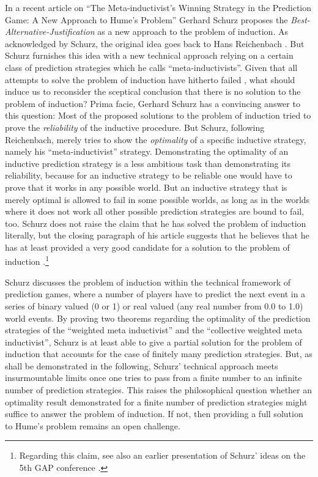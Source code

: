 \documentclass[12pt, a4paper]{article}
\numberwithin{equation}{section}
\begin{document}
In a recent article on ``The Meta-inductivist's Winning Strategy in the
Prediction Game: A New Approach to Hume's Problem'' \cite[]{schurz:2008}
Gerhard Schurz proposes the {\em Best-Alternative-Justification} as a new
approach to the problem of induction. As acknowledged by Schurz, the
original idea goes back to Hans Reichenbach
\cite[]{reichenbach:1935, reichenbach:1938}. But Schurz furnishes this
idea with a new technical approach relying on a certain class of
prediction strategies which he calls ``meta-inductivists''. Given that
all attempts to solve the problem of induction have hitherto failed
\cite[]{howson:2000}, what should induce us to reconsider the sceptical
conclusion that there is no solution to the problem of induction? Prima
facie, Gerhard Schurz has a convincing answer to this question: Most of
the proposed solutions to the problem of induction tried to prove the
{\em reliability} of the inductive procedure. But Schurz, following
Reichenbach, merely tries to show the {\em optimality} of a specific
inductive strategy, namely his ``meta-inductivist'' strategy.
Demonstrating the optimality of an inductive prediction strategy is a
less ambitious task than demonstrating its reliability, because for an
inductive strategy to be reliable one would have to prove that it works
in any possible world. But an inductive strategy that is merely optimal
is allowed to fail in some possible worlds, as long as in the worlds
where it does not work all other possible prediction strategies are bound
to fail, too. Schurz does not raise the claim that he has solved the
problem of induction literally, but the closing paragraph of his article
suggests that he believes that he has at least provided a very good
candidate for a solution to the problem of induction \cite[p.
304]{schurz:2008}.\footnote{Regarding this claim, see also an earlier
presentation of Schurz' ideas on the 5th GAP conference \cite[p.
256]{schurz:2003}.}

Schurz discusses the problem of induction within the technical framework
of prediction games, where a number of players have to predict the next
event in a series of binary valued (0 or 1) or real valued (any real
number from 0.0 to 1.0) world events. By proving two theorems regarding
the optimality of the prediction strategies of the ``weighted meta
inductivist'' and the ``collective weighted meta inductivist'', Schurz is
at least able to give a partial solution for the problem of induction
that accounts for the case of finitely many prediction strategies. But,
as shall be demonstrated in the following, Schurz' technical approach
meets insurmountable limits once one tries to pass from a finite number
to an infinite number of prediction strategies.
This raises the philosophical question whether an optimality result
demonstrated for a finite number of prediction strategies might suffice
to answer the problem of induction. If not, then providing a full
solution to Hume's problem remains an open challenge.
\end{document}
